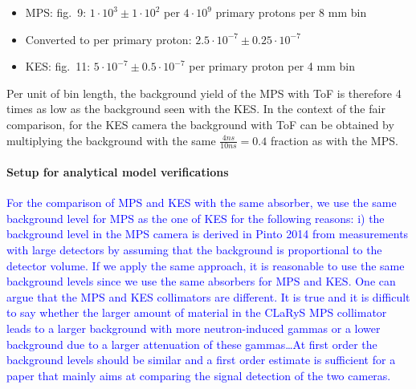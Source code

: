 \documentclass[a4paper,english]{article}
\newcommand{\tcb}[1]{\textcolor{blue}{#1}}
\begin{document}
\begin{itemize}[noitemsep]
\item MPS: \cite{Pinto2014a} fig.~9: $1 \cdot 10^{3} \pm 1 \cdot 10^{2}$ per $4\cdot10^9$ primary protons per 8 mm bin
\item[] Converted to per primary proton: $2.5 \cdot 10^{-7} \pm 0.25 \cdot 10^{-7}$
\item KES: \cite{Perali2014} fig.~11: $5 \cdot 10^{-7} \pm 0.5 \cdot 10^{-7}$ per primary proton per 4 mm bin
\end{itemize}

Per unit of bin length, the background yield of the MPS with ToF is therefore 4 times as low as the background seen with the KES. In the context of the fair comparison, for the KES camera the background with ToF can be obtained by multiplying the background with the same $\frac{4 ns}{10 ns} = 0.4$ fraction as with the MPS.

\paragraph{Setup for analytical model verifications}

\tcb{For the comparison of MPS and KES with the same absorber, we use the same background level for MPS as the one of KES for the following reasons: i) the background level in the MPS camera is derived in Pinto 2014 from measurements with large detectors by assuming that the background is proportional to the detector volume. If we apply the same approach, it is reasonable to use the same background levels since we use the same absorbers for MPS and KES. One can argue that the MPS and KES collimators are different. It is true and it is difficult to say whether the larger amount of material in the CLaRyS MPS collimator leads to a larger background with more neutron-induced gammas or a lower background due to a larger attenuation of these gammas\dots At first order the background levels should be similar and a first order estimate is sufficient for a paper that mainly aims at comparing the signal detection of the two cameras.}



\end{document}
